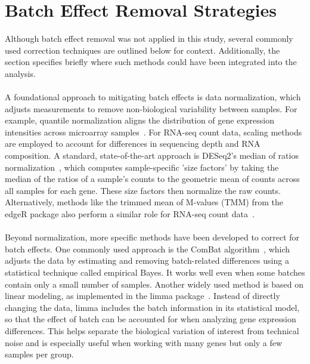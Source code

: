 \documentclass[12pt,a4paper]{report}
\begin{document}
\section{Batch Effect Removal Strategies}
\noindent
Although batch effect removal was not applied in this study, several commonly used correction techniques are outlined below for context. Additionally, the section specifies briefly where such methods could have been integrated into the analysis.\\
\\
A foundational approach to mitigating batch effects is data normalization, which adjusts measurements to remove non-biological variability between samples. For example, quantile normalization aligns the distribution of gene expression intensities across microarray samples~\cite{bolstad2003normalization}.
For RNA-seq count data, scaling methods are employed to account for differences in sequencing depth and RNA composition. A standard, state-of-the-art approach is DESeq2's median of ratios normalization~\cite{love2014deseq2}, which computes sample-specific 'size factors' by taking the median of the ratios of a sample's counts to the geometric mean of counts across all samples for each gene. These size factors then normalize the raw counts. Alternatively, methods like the trimmed mean of M-values (TMM) from the edgeR package also perform a similar role for RNA-seq count data~\cite{robinson2010tmm}.\\
\\
Beyond normalization, more specific methods have been developed to correct for batch effects. One commonly used approach is the ComBat algorithm~\cite{johnson2007combat}, which adjusts the data by estimating and removing batch-related differences using a statistical technique called empirical Bayes. It works well even when some batches contain only a small number of samples. Another widely used method is based on linear modeling, as implemented in the limma package~\cite{ritchie2015limma}. Instead of directly changing the data, limma includes the batch information in its statistical model, so that the effect of batch can be accounted for when analyzing gene expression differences. This helps separate the biological variation of interest from technical noise and is especially useful when working with many genes but only a few samples per group.\\
\\
\end{document}
